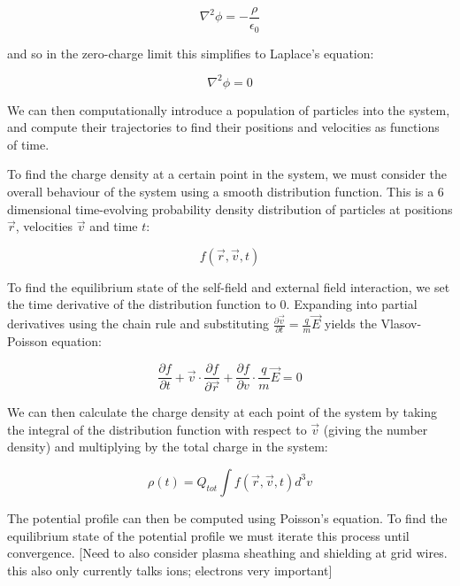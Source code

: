 \documentclass[a4paper,titlepage]{article}
\begin{document}
\begin{flushleft}
\begin{equation}
    \nabla^2\phi = -\frac{\rho}{\epsilon_0}
    \label{poisson}
\end{equation} 

and so in the zero-charge limit this simplifies to Laplace's equation:

\begin{equation}
    \nabla^2\phi = 0
\end{equation} 

We can then computationally introduce a population of particles into the system, and compute their trajectories to find their positions and velocities as functions of time. 

To find the charge density at a certain point in the system, we must consider the overall behaviour of the system using a smooth distribution function. This is a 6 dimensional time-evolving probability density distribution of particles at positions $\vec{r}$, velocities $\vec{v}$ and time $t$:

\begin{equation}
    f(\vec{r}, \vec{v}, t)
\end{equation}

To find the equilibrium state of the self-field and external field interaction, we set the time derivative of the distribution function to 0. Expanding into partial derivatives using the chain rule and substituting $\frac{\partial \vec{v}}{\partial t} = \frac{q}{m}\vec{E}$ yields the Vlasov-Poisson equation:

\begin{equation}
    \frac{\partial f}{\partial t} +\vec{v} \cdot \frac{\partial f}{\partial \vec{r}} + \frac{\partial f}{\partial v} \cdot \frac{q}{m}\vec{E} = 0
\end{equation}

We can then calculate the charge density at each point of the system  by taking the integral of the distribution function with respect to $\vec{v}$ (giving the number density) and multiplying by the total charge in the system:

\begin{equation}
    \rho(t) = Q_{tot} \int f(\vec{r}, \vec{v}, t) d^3v
\end{equation}

The potential profile can then be computed using Poisson's equation. To find the equilibrium state of the potential profile we must iterate this process until convergence.
[Need to also consider plasma sheathing and shielding at grid wires. this also only currently talks ions; electrons very important]


\end{flushleft}
\end{document}
